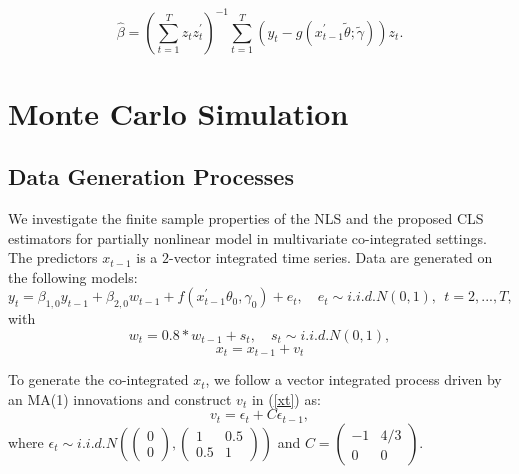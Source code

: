 \documentclass[a4paper,12pt,times,numbered,print,index]{report}
\numberwithin{equation}{section}
\begin{document}
$$
\hat{\beta} = \left( \sum_{t=1}^{T}z_t z_t^{\prime}\right)^{-1}\sum_{t=1}^{T}\left( y_t- g\left( x_{t-1}^{\prime }\tilde{\theta}; \tilde{\gamma}\right)\right) z_t.
$$


\section{Monte Carlo Simulation}

\subsection{Data Generation Processes}
	
	We investigate the finite sample properties of the NLS and the proposed CLS estimators for partially nonlinear model in multivariate co-integrated settings. The predictors $x_{t-1}$ is a $2$-vector integrated time series. Data are generated on the following models:
	$$
	y_{t} = \beta_{1,0} y_{t-1} + \beta_{2,0} w_{t-1} + f\left( x_{t-1}^{\prime }\theta _{0},\gamma _{0}\right) +e_{t}, \quad
	e_{t}\sim i.i.d.N\left( 0,1\right) ,\ \ t=2,...,T,
	$$
	with
	$$
	w_{t} = 0.8*w_{t-1} + s_t, \quad
	s_{t}\sim i.i.d.N\left( 0,1\right),
	$$
	\begin{equation}
		x_t = x_{t-1} + v_t
		\label{xt}
	\end{equation}

	
	
	
	
	To generate the co-integrated $x_t$, we follow a vector integrated process driven by an MA(1) innovations and construct $v_t$ in (\ref{xt}) as:
	$$v_t = \epsilon_t + C\epsilon_{t-1},$$
	where $\epsilon_{t} \sim i.i.d. N\left(\left(\begin{array}{c}
	0 \\
	0
	\end{array}\right)
	,\left(\begin{array}{cc}1 & 0.5 \\ 0.5 & 1\end{array}\right)\right)$ and $C=\left(\begin{array}{cc} -1  & 4/ 3 \\ 0 & 0\end{array}\right)$. 
	\\
	
\end{document}
